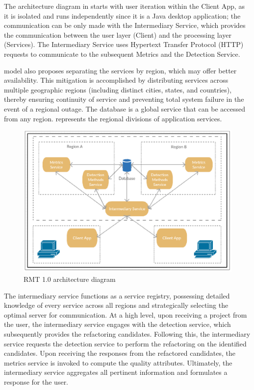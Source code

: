 The architecture diagram in  starts with user iteration within the Client App, as it is isolated and runs independently since it is a Java desktop application; the communication can be only made with the Intermediary Service, which provides the communication between the user layer (Client) and the processing layer (Services). The Intermediary Service uses Hypertext Transfer Protocol (HTTP) requests to communicate to the subsequent Metrics and the Detection Service.

\textcite{beluzzo2018abordagem} model also proposes separating the services by region, which may offer better availability. This mitigation is accomplished by distributing services across multiple geographic regions (including distinct cities, states, and countries), thereby ensuring continuity of service and preventing total system failure in the event of a regional outage. The database is a global service that can be accessed from any region.  represents the regional divisions of application services.

\begin{figure}[ht!]
\SetCaptionWidth{\textwidth}
\caption{RMT 1.0 architecture diagram}
\label{fig-architecture}
\includegraphics[width =\textwidth]{Chapter-2/Figures/schema.png}
\end{figure}
\FloatBarrier

The intermediary service functions as a service registry, possessing detailed knowledge of every service across all regions and strategically selecting the optimal server for communication. At a high level, upon receiving a project from the user, the intermediary service engages with the detection service, which subsequently provides the refactoring candidates. Following this, the intermediary service requests the detection service to perform the refactoring on the identified candidates. Upon receiving the responses from the refactored candidates, the metrics service is invoked to compute the quality attributes. Ultimately, the intermediary service aggregates all pertinent information and formulates a response for the user.

